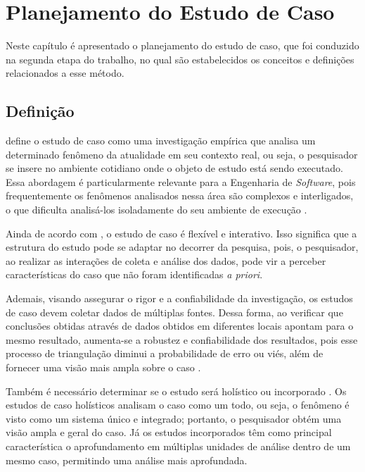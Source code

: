 \chapter[Planejamento do Estudo de Caso]{Planejamento do Estudo de Caso}
\label{chap:planejamento-estudo-caso}

Neste capítulo é apresentado o planejamento do estudo de caso, que foi conduzido na segunda etapa do trabalho, no qual são estabelecidos os conceitos e definições relacionados a esse método. 

\section{Definição} 

 define o estudo de caso como uma investigação empírica que analisa um determinado fenômeno da atualidade em seu contexto real, ou seja, o pesquisador se insere no ambiente cotidiano onde o objeto de estudo está sendo executado. Essa abordagem é particularmente relevante para a Engenharia de \textit{Software}, pois frequentemente os fenômenos analisados nessa área são complexos e interligados, o que dificulta analisá-los isoladamente do seu ambiente de execução \cite{Runeson2009}.

Ainda de acordo com , o estudo de caso é flexível e interativo. Isso significa que a estrutura do estudo pode se adaptar no decorrer da pesquisa, pois, o pesquisador, ao realizar as interações de coleta e análise dos dados, pode vir a perceber características do caso que não foram identificadas \textit{a priori}.

Ademais, visando assegurar o rigor e a confiabilidade da investigação, os estudos de caso devem coletar dados de múltiplas fontes. Dessa forma, ao verificar que conclusões obtidas através de dados obtidos em diferentes locais apontam para o mesmo resultado, aumenta-se a robustez e confiabilidade dos resultados, pois esse processo de triangulação diminui a probabilidade de erro ou viés, além de fornecer uma visão mais ampla sobre o caso \cite{yin2015estudo}.

Também é necessário determinar se o estudo será holístico ou incorporado \cite{yin2015estudo}. Os estudos de caso holísticos analisam o caso como um todo, ou seja, o fenômeno é visto como um sistema único e integrado; portanto, o pesquisador obtém uma visão ampla e geral do caso. Já os estudos incorporados têm como principal característica o aprofundamento em múltiplas unidades de análise dentro de um mesmo caso, permitindo uma análise mais aprofundada.

